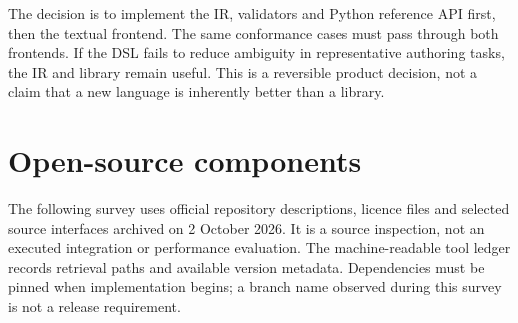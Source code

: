 The decision is to implement the IR, validators and Python reference API first,
then the textual frontend. The same conformance cases must pass through both
frontends. If the DSL fails to reduce ambiguity in representative authoring
tasks, the IR and library remain useful. This is a reversible product decision,
not a claim that a new language is inherently better than a library.

\section{Open-source components}

The following survey uses official repository descriptions, licence files and
selected source interfaces archived on 2 October 2026. It is a source
inspection, not an executed integration or performance evaluation. The
machine-readable tool ledger records retrieval paths and available version
metadata. Dependencies must be pinned when implementation begins; a branch
name observed during this survey is not a release requirement.

